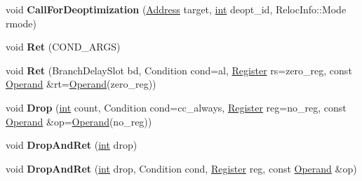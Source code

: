 \begin{DoxyCompactItemize}
\mbox{\label{classv8_1_1internal_1_1TurboAssembler_a8fe9aeaba65f21a5f48bbf9ad66fa18d}} 
void {\bfseries Call\+For\+Deoptimization} (\mbox{\hyperlink{classuintptr__t}{Address}} target, \mbox{\hyperlink{classint}{int}} deopt\+\_\+id, Reloc\+Info\+::\+Mode rmode)
\item 
\mbox{\label{classv8_1_1internal_1_1TurboAssembler_a008314469be8d53c0f842461b0ab8f8d}} 
void {\bfseries Ret} (C\+O\+N\+D\+\_\+\+A\+R\+GS)
\item 
\mbox{\label{classv8_1_1internal_1_1TurboAssembler_acd0f108dfaa849e84d807d8d70d2ea88}} 
void {\bfseries Ret} (Branch\+Delay\+Slot bd, Condition cond=al, \mbox{\hyperlink{classv8_1_1internal_1_1Register}{Register}} rs=zero\+\_\+reg, const \mbox{\hyperlink{classv8_1_1internal_1_1Operand}{Operand}} \&rt=\mbox{\hyperlink{classv8_1_1internal_1_1Operand}{Operand}}(zero\+\_\+reg))
\item 
\mbox{\label{classv8_1_1internal_1_1TurboAssembler_a8b83cbfc7502c2a8f2787a538868175c}} 
void {\bfseries Drop} (\mbox{\hyperlink{classint}{int}} count, Condition cond=cc\+\_\+always, \mbox{\hyperlink{classv8_1_1internal_1_1Register}{Register}} reg=no\+\_\+reg, const \mbox{\hyperlink{classv8_1_1internal_1_1Operand}{Operand}} \&op=\mbox{\hyperlink{classv8_1_1internal_1_1Operand}{Operand}}(no\+\_\+reg))
\item 
\mbox{\label{classv8_1_1internal_1_1TurboAssembler_abc9eb9fc809f464c9ec874b02142ccc8}} 
void {\bfseries Drop\+And\+Ret} (\mbox{\hyperlink{classint}{int}} drop)
\item 
\mbox{\label{classv8_1_1internal_1_1TurboAssembler_ac05346520d34cffe7e008747c1de8403}} 
void {\bfseries Drop\+And\+Ret} (\mbox{\hyperlink{classint}{int}} drop, Condition cond, \mbox{\hyperlink{classv8_1_1internal_1_1Register}{Register}} reg, const \mbox{\hyperlink{classv8_1_1internal_1_1Operand}{Operand}} \&op)
\item 
\mbox{\label{classv8_1_1internal_1_1TurboAssembler_a66faf5bf8263949c72503e5beb96608e}} 

\end{DoxyCompactItemize}
